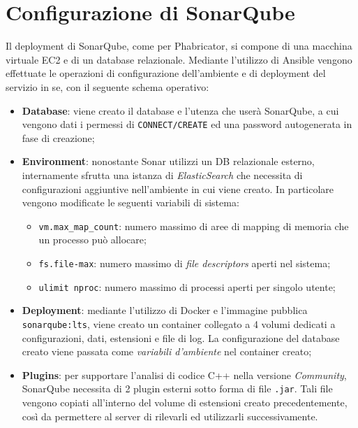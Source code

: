 \documentclass[../main.tex]{subfiles}
\begin{document}
    	\section{Configurazione di SonarQube}
    	
    	    Il deployment di SonarQube, come per Phabricator, si compone di una macchina virtuale EC2 e di un database relazionale. Mediante l'utilizzo di Ansible vengono effettuate le operazioni di configurazione dell'ambiente e di deployment del servizio in se, con il seguente schema operativo:
    	    \begin{itemize}
    	        \item \textbf{Database}: viene creato il database e l'utenza che userà SonarQube, a cui vengono dati i permessi di \verb|CONNECT/CREATE| ed una password autogenerata in fase di creazione;
    	        \item \textbf{Environment}: nonostante Sonar utilizzi un DB relazionale esterno, internamente sfrutta una istanza di \emph{ElasticSearch} che necessita di configurazioni aggiuntive nell'ambiente in cui viene creato. In particolare vengono modificate le seguenti variabili di sistema:
    	        \begin{itemize}
    	            \item \verb|vm.max_map_count|: numero massimo di aree di mapping di memoria che un processo può allocare;
    	            \item \verb|fs.file-max|: numero massimo di \emph{file descriptors} aperti nel sistema;
    	            \item \verb|ulimit nproc|: numero massimo di processi aperti per singolo utente;
    	        \end{itemize}
    	        \item \textbf{Deployment}: mediante l'utilizzo di Docker e l'immagine pubblica \verb|sonarqube:lts|, viene creato un container collegato a 4 volumi dedicati a configurazioni, dati, estensioni e file di log. La configurazione del database creato viene passata come \emph{variabili d'ambiente} nel container creato;
    	        \item \textbf{Plugins}: per supportare l'analisi di codice C++ nella versione \emph{Community}, SonarQube necessita di 2 plugin esterni sotto forma di file \verb|.jar|. Tali file vengono copiati all'interno del volume di estensioni creato precedentemente, così da permettere al server di rilevarli ed utilizzarli successivamente.
    	    \end{itemize}
    	    
\end{document}
